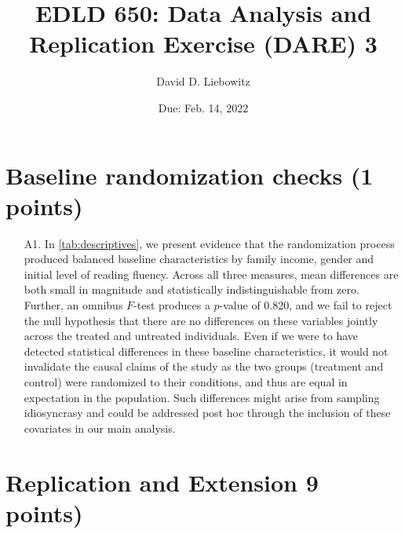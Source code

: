 \documentclass[a4paper, 11pt]{article}
\title{EDLD 650: Data Analysis and Replication Exercise (DARE) 3}
\author{David D. Liebowitz}
\date{Due: Feb. 14, 2022}
\begin{document}
\maketitle



\section{Baseline randomization checks (1 points)}



\begin{enumerate}
	\item[A1.] In \autoref{tab:descriptives}, we present evidence that the randomization process produced balanced baseline characteristics by family income, gender and initial level of reading fluency. Across all three measures, mean differences are both small in magnitude and statistically indistinguishable from zero. Further, an omnibus $F$-test produces a $p$-value of 0.820, and we fail to reject the null hypothesis that there are no differences on these variables jointly across the treated and untreated individuals. Even if we were to have detected statistical differences in these baseline characteristics, it would not invalidate the causal claims of the study as the two groups (treatment and control) were randomized to their conditions, and thus are equal in expectation in the population. Such differences might arise from sampling idiosyncrasy and could be addressed post hoc through the inclusion of these covariates in our main analysis.
\end{enumerate}



\section{Replication and Extension 9 points)}
\end{document}
